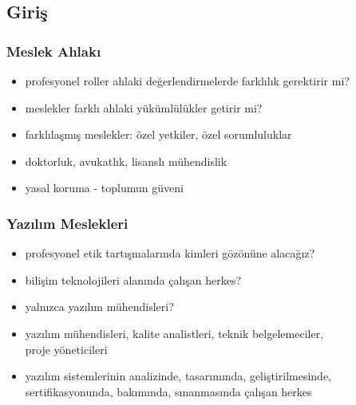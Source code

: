 \documentclass[dvipsnames]{beamer}
\theoremstyle{plain}
\begin{document}
\subsection{Giriş}

\begin{frame}
  \frametitle{Meslek Ahlakı}

  \begin{itemize}
    \item profesyonel roller ahlaki değerlendirmelerde farklılık gerektirir mi?
    \item meslekler farklı ahlaki yükümlülükler getirir mi?

    \pause
    \bigskip
    \item farklılaşmış meslekler: özel yetkiler, özel sorumluluklar
    \item doktorluk, avukatlık, lisanslı mühendislik
    \item yasal koruma - toplumun güveni
  \end{itemize}
\end{frame}

\begin{frame}
  \frametitle{Yazılım Meslekleri}

  \begin{itemize}
    \item profesyonel etik tartışmalarında kimleri gözönüne alacağız?
    \item bilişim teknolojileri alanında çalışan herkes?
    \item yalnızca yazılım mühendisleri?

    \pause
    \medskip
    \item yazılım mühendisleri, kalite analistleri, teknik belgelemeciler,\\
      proje yöneticileri
    \item yazılım sistemlerinin analizinde, tasarımında, geliştirilmesinde,\\
      sertifikasyonunda, bakımında, sınanmasında çalışan herkes
  \end{itemize}
\end{frame}
\end{document}
